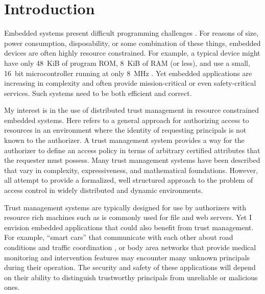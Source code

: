 \chapter{Introduction}
\label{chapter-introduction}

Embedded systems present difficult programming challenges
\cite{Mottola:2011:PWS:1922649.1922656}. For reasons of size, power consumption, disposability,
or some combination of these things, embedded devices are often highly resource constrained. For
example, a typical device might have only 48~KiB of program ROM, 8~KiB of RAM (or less), and use
a small, 16~bit microcontroller running at only 8~MHz \cite{tmotesky-datasheet}. Yet embedded
applications are increasing in complexity and often provide mission-critical or even
safety-critical services. Such systems need to be both efficient and correct.

My interest is in the use of distributed trust management in resource constrained embedded
systems. Here  refers to a general approach for authorizing access to
resources in an environment where the identity of requesting principals is not known to the
authorizer. A trust management system provides a way for the authorizer to define an access
policy in terms of arbitrary certified attributes that the requester must possess. Many trust
management systems have been described \cite{chapin-skalka-wang-acmcs08} that vary in
complexity, expressiveness, and mathematical foundations. However, all attempt to provide a
formalized, well structured approach to the problem of access control in widely distributed and
dynamic environments.

Trust management systems are typically designed for use by authorizers with resource rich
machines such as is commonly used for file and web servers. Yet I envision embedded applications
that could also benefit from trust management. For example, ``smart cars'' that communicate with
each other about road conditions and traffic coordination
\cite{Seepold:2009:ESP:1641563.1641568}, or body area networks that provide medical monitoring
and intervention features \cite{Shnayder:2005:SNM:1098918.1098979,Chen:2011:BAN:1968858.1968873}
may encounter many unknown principals during their operation. The security and safety of these
applications will depend on their ability to distinguish trustworthy principals from unreliable
or malicious ones.

